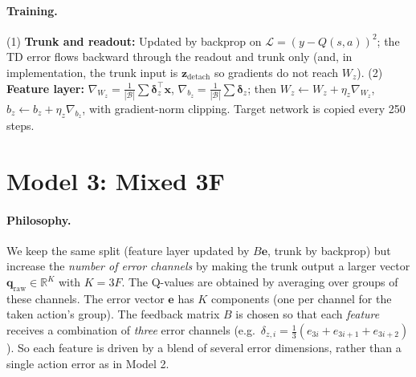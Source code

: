 \documentclass[11pt]{article}
\begin{document}
\paragraph{Training.} (1) \textbf{Trunk and readout:} Updated by backprop on $\mathcal{L} = (y - Q(s,a))^2$; the TD error flows backward through the readout and trunk only (and, in implementation, the trunk input is $\mathbf{z}_{\mathrm{detach}}$ so gradients do not reach $W_z$). (2) \textbf{Feature layer:} $\nabla_{W_z} = \frac{1}{|\mathcal{B}|} \sum \boldsymbol{\delta}_z^{\top} \mathbf{x}$, $\nabla_{b_z} = \frac{1}{|\mathcal{B}|} \sum \boldsymbol{\delta}_z$; then $W_z \leftarrow W_z + \eta_z \nabla_{W_z}$, $b_z \leftarrow b_z + \eta_z \nabla_{b_z}$, with gradient-norm clipping. Target network is copied every 250 steps.

\section{Model 3: Mixed 3F}

\paragraph{Philosophy.} We keep the same split (feature layer updated by $B\mathbf{e}$, trunk by backprop) but increase the \emph{number of error channels} by making the trunk output a larger vector $\mathbf{q}_{\mathrm{raw}} \in \mathbb{R}^K$ with $K = 3F$. The Q-values are obtained by averaging over groups of these channels. The error vector $\mathbf{e}$ has $K$ components (one per channel for the taken action's group). The feedback matrix $B$ is chosen so that each \emph{feature} receives a combination of \emph{three} error channels (e.g.\ $\delta_{z,i} = \frac{1}{3}(e_{3i}+e_{3i+1}+e_{3i+2})$). So each feature is driven by a blend of several error dimensions, rather than a single action error as in Model 2.
\end{document}
